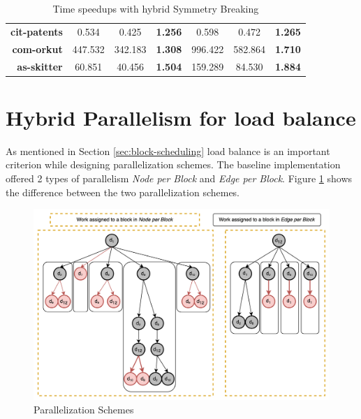 {\begin{table}[]
{\begin{tabular}{r|cc|c|cc|c}
            \textbf{cit-patents}                 & 0.534                                   & 0.425                                 & \textbf{1.256}                          & 0.598                             & 0.472                  & \textbf{1.265} \\
            \textbf{com-orkut}                   & 447.532                                 & 342.183                               & \textbf{1.308}                          & 996.422                           & 582.864                & \textbf{1.710} \\
            \textbf{as-skitter}                  & 60.851                                  & 40.456                                & \textbf{1.504}                          & 159.289                           & 84.530                 & \textbf{1.884}
        \end{tabular}%
    }
    \caption{Time speedups with hybrid Symmetry Breaking}
    \label{tab:speedups-hy-sym}
\end{table}


\section{Hybrid Parallelism for load balance}

As mentioned in Section \ref{sec:block-scheduling} load balance is an important criterion while designing parallelization schemes.
The baseline implementation \cite{PARSEC_VD} offered 2 types of parallelism \textit{Node per Block} and \textit{Edge per Block}.
Figure \ref{fig:parallelization-schemes} shows the difference between the two parallelization schemes.
\begin{figure}
    \includegraphics[width=\textwidth]{fig/parallelization-scheme.png}
    \caption{Parallelization Schemes}
    \label{fig:parallelization-schemes}
\end{figure}

}
